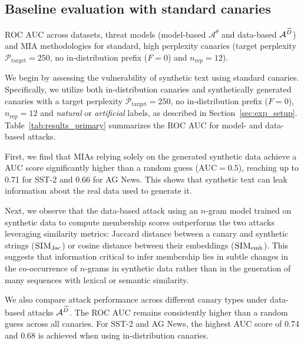 \subsection{Baseline evaluation with standard canaries}
\label{sec:baseline_results}

\begin{table*}[t!]
    \centering
    \footnotesize
    
    \caption{ROC AUC across datasets, threat models (model-based $\mathcal{A}^\theta$ and data-based $\mathcal{A}^{{\widetilde{D}}}$) and MIA methodologies for standard, high perplexity canaries (target perplexity $\mathcal{P}_\textrm{target}=250$, no in-distribution prefix ($F=0$) and  $n_\textrm{rep}=12$).} 
    \label{tab:results_primary}
\end{table*}

We begin by assessing the vulnerability of synthetic text using standard canaries. Specifically, we utilize both in-distribution canaries and synthetically generated canaries with a target perplexity $\mathcal{P}_\textrm{target}=250$, no in-distribution prefix ($F=0$), $n_\textrm{rep}=12$ and \emph{natural} or \emph{artificial} labels, as described in Section~\ref{sec:exp_setup}.
Table~\ref{tab:results_primary} summarizes the ROC AUC for model- and data-based attacks.

First, we find that MIAs relying solely on the generated synthetic data achieve a AUC score significantly higher than a random guess (\ie $\text{AUC}=0.5$), reaching up to \num{0.71} for SST-2 and \num{0.66} for AG News. This shows that synthetic text can leak information about the real data used to generate it.

Next, we observe that the data-based attack using an $n$-gram model trained on synthetic data to compute membership scores outperforms the two attacks leveraging similarity metrics: Jaccard distance between a canary and synthetic strings ($\textsc{SIM}_\textrm{Jac}$) or cosine distance between their embeddings ($\textsc{SIM}_\textrm{emb}$).
%
This suggests that information critical to infer membership lies in subtle changes in the co-occurrence of $n$-grams in synthetic data rather than in the generation of many sequences with lexical or semantic similarity.

We also compare attack performance across different canary types under data-based attacks $\mathcal{A}^{{\widetilde{D}}}$.
The ROC AUC remains consistently higher than a random guess across all canaries.
For SST-2 and AG News, the highest AUC score of \num{0.74} and \num{0.68} is achieved when using in-distribution canaries.


